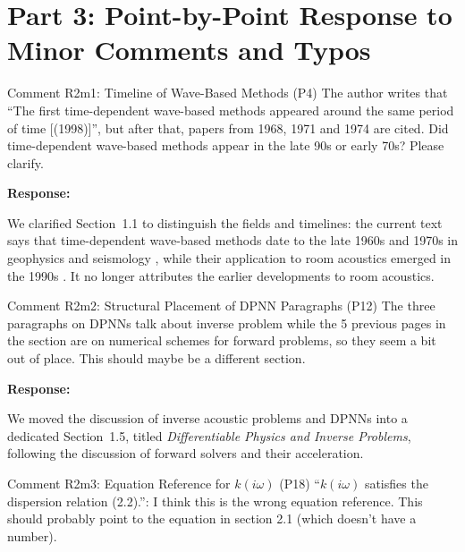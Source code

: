 \documentclass[11pt,a4paper]{article}
\newenvironment{response}{
    \par\vspace{1mm}\noindent\textbf{\textcolor{responseframe}{Response:}}\par\vspace{1mm}
}{
    \par\vspace{3mm}
}
\begin{document}
\newpage
\section{Part 3: Point-by-Point Response to Minor Comments and Typos}

\begin{revcomment}{Comment R2m1: Timeline of Wave-Based Methods (P4)}
The author writes that ``The first time-dependent wave-based methods appeared around the same period of time [(1998)]'', but after that, papers from 1968, 1971 and 1974 are cited. Did time-dependent wave-based methods appear in the late 90s or early 70s? Please clarify.
\end{revcomment}

\begin{response}
We clarified Section~1.1 to distinguish the fields and timelines: the current text says that time-dependent wave-based methods date to the late 1960s and 1970s in geophysics and seismology \citep{alterman_propagation_1968,ottaviani_elastic-wave_1971,alford_accuracy_1974}, while their application to room acoustics emerged in the 1990s \citep{botteldooren_finitedifference_1995}. It no longer attributes the earlier developments to room acoustics.
\end{response}

\begin{revcomment}{Comment R2m2: Structural Placement of DPNN Paragraphs (P12)}
The three paragraphs on DPNNs talk about inverse problem while the 5 previous pages in the section are on numerical schemes for forward problems, so they seem a bit out of place. This should maybe be a different section.
\end{revcomment}

\begin{response}
We moved the discussion of inverse acoustic problems and DPNNs into a dedicated Section~1.5, titled \emph{Differentiable Physics and Inverse Problems}, following the discussion of forward solvers and their acceleration.
\end{response}

\begin{revcomment}{Comment R2m3: Equation Reference for $k(i\omega)$ (P18)}
``$k(i\omega)$ satisfies the dispersion relation (2.2).'': I think this is the wrong equation reference. This should probably point to the equation in section 2.1 (which doesn't have a number).
\end{revcomment}
\end{document}
